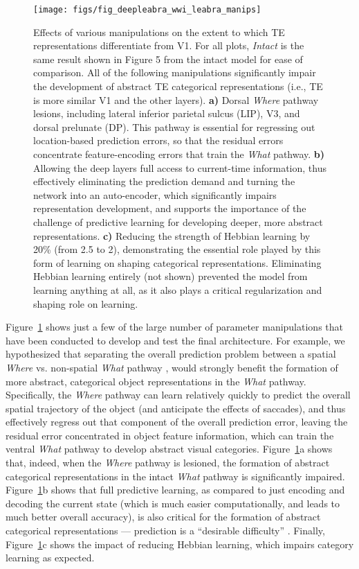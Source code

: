 \documentclass[11pt,twoside]{article}
\newif\myifpdf
\begin{document}
\begin{figure}
  \centering\texttt{[image: figs/fig\_deepleabra\_wwi\_leabra\_manips]}
  \caption{Effects of various manipulations on the extent to which TE representations differentiate from V1.  For all plots, \emph{Intact} is the same result shown in Figure 5 from the intact model for ease of comparison.  All of the following  manipulations significantly impair the development of abstract TE categorical representations (i.e., TE is more similar V1 and the other layers).  {\bf a)} Dorsal \emph{Where} pathway lesions, including lateral inferior parietal sulcus (LIP), V3, and dorsal prelunate (DP).  This pathway is essential for regressing out location-based prediction errors, so that the residual errors concentrate feature-encoding errors that train the \emph{What} pathway.  {\bf b)} Allowing the deep layers full access to current-time information, thus effectively eliminating the prediction demand and turning the network into an auto-encoder, which significantly impairs representation development, and supports the importance of the challenge of predictive learning for developing deeper, more abstract representations.  {\bf c)} Reducing the strength of Hebbian learning by 20\% (from 2.5 to 2), demonstrating the essential role played by this form of learning on shaping categorical representations.  Eliminating Hebbian learning entirely (not shown) prevented the model from learning anything at all, as it also plays a critical regularization and shaping role on learning.}
  \label{fig.manips}
\end{figure}

Figure~\ref{fig.manips} shows just a few of the large number of parameter manipulations that have been conducted to develop and test the final architecture.  For example, we hypothesized that separating the overall prediction problem between a spatial \emph{Where} vs. non-spatial \emph{What} pathway \citep{UngerleiderMishkin82,GoodaleMilner92}, would strongly benefit the formation of more abstract, categorical object representations in the \emph{What} pathway.  Specifically, the \emph{Where} pathway can learn relatively quickly to predict the overall spatial trajectory of the object (and anticipate the effects of saccades), and thus effectively regress out that component of the overall prediction error, leaving the residual error concentrated in object feature information, which can train the ventral \emph{What} pathway to develop abstract visual categories.  Figure~\ref{fig.manips}a shows that, indeed, when the \emph{Where} pathway is lesioned, the formation of abstract categorical representations in the intact \emph{What} pathway is significantly impaired.  Figure~\ref{fig.manips}b shows that full predictive learning, as compared to just encoding and decoding the current state (which is much easier computationally, and leads to much better overall accuracy), is also critical for the formation of abstract categorical representations --- prediction is a ``desirable difficulty'' \citep{Bjork94}.  Finally, Figure~\ref{fig.manips}c shows the impact of reducing Hebbian learning, which impairs category learning as expected.
\end{document}
